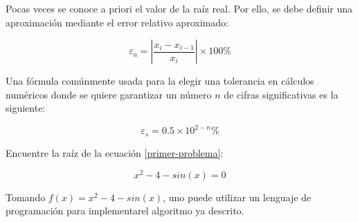 Pocas veces se conoce a priori el valor de la raíz real. Por ello, se
debe definir una aproximación mediante el error relativo aproximado:

\[
	\varepsilon_a = \left| \frac{x_i - x_{i-1}}{x_i} \right| \times 100\%
\]

Una fórmula comúnmente usada para la elegir una tolerancia en cálculos numéricos
donde se quiere garantizar un número $n$ de cifras significativas es la
siguiente:

\[
	\varepsilon_s = 0.5 \times 10^{2-n} \%
\]

\begin{ex}

	Encuentre la raíz de la ecuación \ref{primer-problema}:

	\[
		x^2 - 4 - sin(x) = 0
	\]

	\begin{solution}
		Tomando $f(x) = x^2 - 4 - sin(x)$, uno puede utilizar un
		lenguaje de programación para implementarel algoritmo ya
		descrito.

		

		
	\end{solution}
	
\end{ex}
